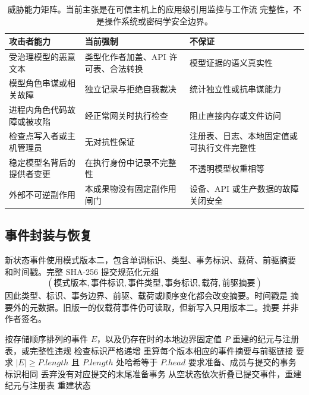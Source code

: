 \begin{table}[htbp]
  \centering
  \small
  \begin{tabularx}{\textwidth}{@{}p{}XX@{}}
    \toprule
    \textbf{攻击者能力} & \textbf{当前强制} & \textbf{不保证} \\
    \midrule
    受治理模型的恶意文本 &
      类型化作者加盖、API 许可表、合法转换 &
      模型证据的语义真实性 \\
    模型角色串谋或相关故障 &
      独立记录与拒绝自我裁决 &
      统计独立性或抗串谋能力 \\
    进程内角色代码故障或被攻陷 &
      经正常网关时执行检查 &
      阻止直接内存或文件访问 \\
    检查点写入者或主机管理员 &
      无对抗性保证 &
      注册表、日志、本地固定值或可执行文件完整性 \\
    稳定模型名背后的提供者变更 &
      在执行身份中记录不完整性 &
      不透明模型权重相等 \\
    外部不可逆副作用 &
      本成果物没有固定副作用闸门 &
      设备、API 或生产数据的故障关闭安全 \\
    \bottomrule
  \end{tabularx}
  \caption{威胁能力矩阵。当前主张是在可信主机上的应用级引用监控与工作流
  完整性，不是操作系统或密码学安全边界。}
  \label{tab:threat-capability}
\end{table}

\subsection{事件封装与恢复}\label{sec:appendix:events}

新状态事件使用模式版本二，包含单调标识、类型、事务标识、载荷、前驱摘要
和时间戳。完整 SHA-256 提交规范化元组
\[
  (\textit{模式版本},\textit{事件标识},\textit{事件类型},
  \textit{事务标识},\textit{载荷},\textit{前驱摘要})
\]
因此类型、标识、事务边界、前驱、载荷或顺序变化都会改变摘要。时间戳是
摘要外的元数据。旧版一的仅载荷事件仍可读取，但新写入只用版本二。摘要
并非作者签名。

\begin{algorithm}[htbp]
\caption{确定性的恢复投影}
\begin{algorithmic}[1]
\Require 按存储顺序排列的事件 $E$，以及仍存在时的本地边界固定值 $P$
\Ensure 重建的纪元与注册表，或完整性违规
\State 检查标识严格递增
\State 重算每个版本相应的事件摘要与前驱链接
  \State 要求 $|E|\geq P.length$ 且 $P.length$ 处哈希等于 $P.head$
\EndIf
\State 要求准备、成员与提交的事务标识相同
\State 丢弃没有对应提交的末尾准备事务
\State 从空状态依次折叠已提交事件，重建纪元与注册表
\State \Return 重建状态
\end{algorithmic}
\end{algorithm}

